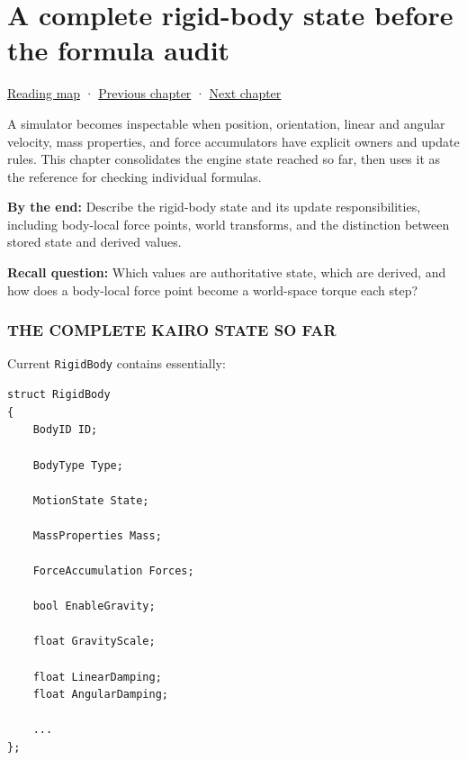 \chapter{A complete rigid-body state before the formula audit}\label{06-engine-ii-ch035-a-complete-rigid-body-state-before-the-formula-audit}\hypertarget{06-engine-ii-ch035}{}\label{stagechapter:06-engine-ii-ch035}

\hypertarget{06-engine-ii-ch035-a-complete-rigid-body-state-before-the-formula-audit}{}

\hyperref[volume-reading-map]{Reading map} · \hyperref[06-engine-ii-ch034-rigid-body-motion-from-forces-to-contact]{Previous chapter} · \hyperref[06-engine-ii-ch036-auditing-capsule-mass-properties-and-collision-formulas]{Next chapter}

A simulator becomes inspectable when position, orientation, linear and angular velocity, mass properties, and force accumulators have explicit owners and update rules. This chapter consolidates the engine state reached so far, then uses it as the reference for checking individual formulas.

\textbf{By the end:} Describe the rigid-body state and its update responsibilities, including body-local force points, world transforms, and the distinction between stored state and derived values.

\textbf{Recall question:} Which values are authoritative state, which are derived, and how does a body-local force point become a world-space torque each step?

\subsection{THE COMPLETE KAIRO STATE SO FAR}\label{06-engine-ii-ch035-the-complete-kairo-state-so-far}

\hypertarget{06-engine-ii-ch035-the-complete-kairo-state-so-far}{}

Current \texttt{RigidBody} contains essentially:

\begin{verbatim}
struct RigidBody
{
    BodyID ID;

    BodyType Type;

    MotionState State;

    MassProperties Mass;

    ForceAccumulation Forces;

    bool EnableGravity;

    float GravityScale;

    float LinearDamping;
    float AngularDamping;

    ...
};
\end{verbatim}

